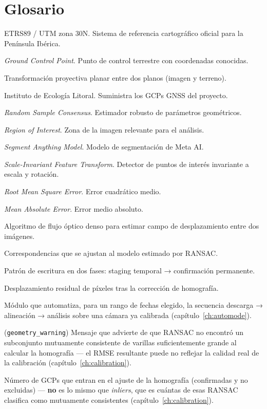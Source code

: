 \chapter{Glosario}
\label{app:glossary}

\begin{description}[leftmargin=3cm, style=nextline]
  \item[EPSG:25830] ETRS89 / UTM zona 30N. Sistema de referencia cartográfico oficial para la Península Ibérica.
  \item[GCP] \textit{Ground Control Point}. Punto de control terrestre con coordenadas conocidas.
  \item[Homografía] Transformación proyectiva planar entre dos planos (imagen y terreno).
  \item[IEL] Instituto de Ecología Litoral. Suministra los GCPs GNSS del proyecto.
  \item[RANSAC] \textit{Random Sample Consensus}. Estimador robusto de parámetros geométricos.
  \item[ROI] \textit{Region of Interest}. Zona de la imagen relevante para el análisis.
  \item[SAM] \textit{Segment Anything Model}. Modelo de segmentación de Meta AI.
  \item[SIFT] \textit{Scale-Invariant Feature Transform}. Detector de puntos de interés invariante a escala y rotación.
  \item[RMSE] \textit{Root Mean Square Error}. Error cuadrático medio.
  \item[MAE] \textit{Mean Absolute Error}. Error medio absoluto.
  \item[Farneback] Algoritmo de flujo óptico denso para estimar campo de desplazamiento entre dos imágenes.
  \item[Inliers] Correspondencias que se ajustan al modelo estimado por RANSAC.
  \item[Two-phase commit] Patrón de escritura en dos fases: staging temporal → confirmación permanente.
  \item[Drift] Desplazamiento residual de píxeles tras la corrección de homografía.
  \item[Auto Mode] Módulo que automatiza, para un rango de fechas elegido, la secuencia
        descarga → alineación → análisis sobre una cámara ya calibrada
        (capítulo~\ref{ch:automode}).
  \item[Aviso de geometría inestable] (\texttt{geometry\_warning}) Mensaje que advierte de que
        RANSAC no encontró un subconjunto mutuamente consistente de varillas suficientemente
        grande al calcular la homografía — el RMSE resultante puede no reflejar la calidad real
        de la calibración (capítulo~\ref{ch:calibration}).
  \item[Varillas usadas] Número de GCPs que entran en el ajuste de la homografía (confirmadas y
        no excluidas) — \textbf{no} es lo mismo que \textit{inliers}, que es cuántas de esas
        RANSAC clasifica como mutuamente consistentes (capítulo~\ref{ch:calibration}).
\end{description}

